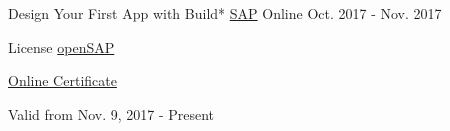 

\begin{cventries}

  \cventry
    {Design Your First App with Build*} %
    {\href{https://www.sap.com/index.html}{SAP}} %
    {Online} %
    {Oct. 2017 - Nov. 2017} %
    {
	    \begin{cvitems} %
        \item {License \href{https://open.sap.com/}{openSAP}} %
        \item {\href{https://open.sap.com/verify/xoban-setyz-vogaf-leryz-lufor}{Online Certificate}} %
        \item {Valid from Nov. 9, 2017 - Present} %
      \end{cvitems}
    }      
	  
	  

\end{cventries}
